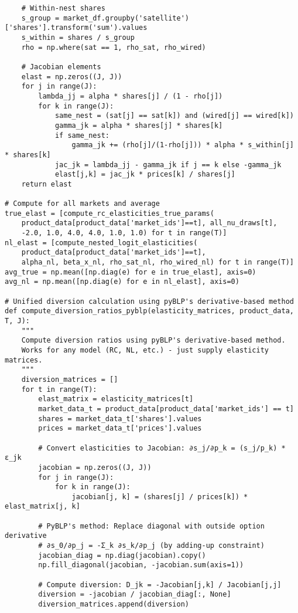 \documentclass[english,11pt]{article}
\begin{document}
\begin{enumerate}
\begin{verbatim}
    # Within-nest shares
    s_group = market_df.groupby('satellite')['shares'].transform('sum').values
    s_within = shares / s_group
    rho = np.where(sat == 1, rho_sat, rho_wired)
    
    # Jacobian elements
    elast = np.zeros((J, J))
    for j in range(J):
        lambda_jj = alpha * shares[j] / (1 - rho[j])
        for k in range(J):
            same_nest = (sat[j] == sat[k]) and (wired[j] == wired[k])
            gamma_jk = alpha * shares[j] * shares[k]
            if same_nest:
                gamma_jk += (rho[j]/(1-rho[j])) * alpha * s_within[j] * shares[k]
            jac_jk = lambda_jj - gamma_jk if j == k else -gamma_jk
            elast[j,k] = jac_jk * prices[k] / shares[j]
    return elast

# Compute for all markets and average
true_elast = [compute_rc_elasticities_true_params(
    product_data[product_data['market_ids']==t], all_nu_draws[t], 
    -2.0, 1.0, 4.0, 4.0, 1.0, 1.0) for t in range(T)]
nl_elast = [compute_nested_logit_elasticities(
    product_data[product_data['market_ids']==t], 
    alpha_nl, beta_x_nl, rho_sat_nl, rho_wired_nl) for t in range(T)]
avg_true = np.mean([np.diag(e) for e in true_elast], axis=0)
avg_nl = np.mean([np.diag(e) for e in nl_elast], axis=0)

# Unified diversion calculation using pyBLP's derivative-based method
def compute_diversion_ratios_pyblp(elasticity_matrices, product_data, T, J):
    """
    Compute diversion ratios using pyBLP's derivative-based method.
    Works for any model (RC, NL, etc.) - just supply elasticity matrices.
    """
    diversion_matrices = []
    for t in range(T):
        elast_matrix = elasticity_matrices[t]
        market_data_t = product_data[product_data['market_ids'] == t]
        shares = market_data_t['shares'].values
        prices = market_data_t['prices'].values
        
        # Convert elasticities to Jacobian: ∂s_j/∂p_k = (s_j/p_k) * ε_jk
        jacobian = np.zeros((J, J))
        for j in range(J):
            for k in range(J):
                jacobian[j, k] = (shares[j] / prices[k]) * elast_matrix[j, k]
        
        # PyBLP's method: Replace diagonal with outside option derivative
        # ∂s_0/∂p_j = -Σ_k ∂s_k/∂p_j (by adding-up constraint)
        jacobian_diag = np.diag(jacobian).copy()
        np.fill_diagonal(jacobian, -jacobian.sum(axis=1))
        
        # Compute diversion: D_jk = -Jacobian[j,k] / Jacobian[j,j]
        diversion = -jacobian / jacobian_diag[:, None]
        diversion_matrices.append(diversion)
    

\end{verbatim}
\end{enumerate}
\end{document}
